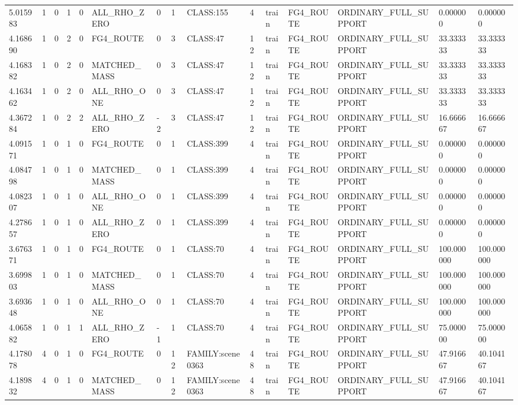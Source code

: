 \begin{tabular}{lllllllllllllll}
5.015983 & 1 & 0 & 1 & 0 & ALL\_RHO\_ZERO & 0 & 1 & CLASS:155 & 4 & train & FG4\_ROUTE & ORDINARY\_FULL\_SUPPORT & 0.000000 & 0.000000 \\
4.168690 & 1 & 0 & 2 & 0 & FG4\_ROUTE & 0 & 3 & CLASS:47 & 12 & train & FG4\_ROUTE & ORDINARY\_FULL\_SUPPORT & 33.333333 & 33.333333 \\
4.168382 & 1 & 0 & 2 & 0 & MATCHED\_MASS & 0 & 3 & CLASS:47 & 12 & train & FG4\_ROUTE & ORDINARY\_FULL\_SUPPORT & 33.333333 & 33.333333 \\
4.163462 & 1 & 0 & 2 & 0 & ALL\_RHO\_ONE & 0 & 3 & CLASS:47 & 12 & train & FG4\_ROUTE & ORDINARY\_FULL\_SUPPORT & 33.333333 & 33.333333 \\
4.367284 & 1 & 0 & 2 & 2 & ALL\_RHO\_ZERO & -2 & 3 & CLASS:47 & 12 & train & FG4\_ROUTE & ORDINARY\_FULL\_SUPPORT & 16.666667 & 16.666667 \\
4.091571 & 1 & 0 & 1 & 0 & FG4\_ROUTE & 0 & 1 & CLASS:399 & 4 & train & FG4\_ROUTE & ORDINARY\_FULL\_SUPPORT & 0.000000 & 0.000000 \\
4.084798 & 1 & 0 & 1 & 0 & MATCHED\_MASS & 0 & 1 & CLASS:399 & 4 & train & FG4\_ROUTE & ORDINARY\_FULL\_SUPPORT & 0.000000 & 0.000000 \\
4.082307 & 1 & 0 & 1 & 0 & ALL\_RHO\_ONE & 0 & 1 & CLASS:399 & 4 & train & FG4\_ROUTE & ORDINARY\_FULL\_SUPPORT & 0.000000 & 0.000000 \\
4.278657 & 1 & 0 & 1 & 0 & ALL\_RHO\_ZERO & 0 & 1 & CLASS:399 & 4 & train & FG4\_ROUTE & ORDINARY\_FULL\_SUPPORT & 0.000000 & 0.000000 \\
3.676371 & 1 & 0 & 1 & 0 & FG4\_ROUTE & 0 & 1 & CLASS:70 & 4 & train & FG4\_ROUTE & ORDINARY\_FULL\_SUPPORT & 100.000000 & 100.000000 \\
3.699803 & 1 & 0 & 1 & 0 & MATCHED\_MASS & 0 & 1 & CLASS:70 & 4 & train & FG4\_ROUTE & ORDINARY\_FULL\_SUPPORT & 100.000000 & 100.000000 \\
3.693648 & 1 & 0 & 1 & 0 & ALL\_RHO\_ONE & 0 & 1 & CLASS:70 & 4 & train & FG4\_ROUTE & ORDINARY\_FULL\_SUPPORT & 100.000000 & 100.000000 \\
4.065882 & 1 & 0 & 1 & 1 & ALL\_RHO\_ZERO & -1 & 1 & CLASS:70 & 4 & train & FG4\_ROUTE & ORDINARY\_FULL\_SUPPORT & 75.000000 & 75.000000 \\
4.178078 & 4 & 0 & 1 & 0 & FG4\_ROUTE & 0 & 12 & FAMILY:scene0363 & 48 & train & FG4\_ROUTE & ORDINARY\_FULL\_SUPPORT & 47.916667 & 40.104167 \\
4.189832 & 4 & 0 & 1 & 0 & MATCHED\_MASS & 0 & 12 & FAMILY:scene0363 & 48 & train & FG4\_ROUTE & ORDINARY\_FULL\_SUPPORT & 47.916667 & 40.104167 \\

\end{tabular}
